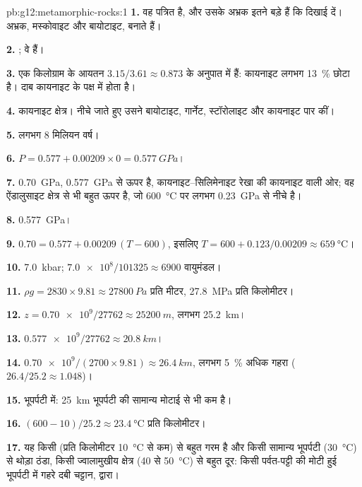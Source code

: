 \begin{solution}{pb:g12:metamorphic-rocks:1}
\textbf{1.} वह पत्रित है, और उसके अभ्रक इतने बड़े हैं कि दिखाई दें।
अभ्रक, मस्कोवाइट और बायोटाइट,  बनाते हैं।

\textbf{2.} ; वे  हैं।

\textbf{3.} एक किलोग्राम के आयतन $3.15/3.61 \approx
0.873$ के अनुपात में हैं: कायनाइट लगभग \qty{13}{\percent} छोटा है। दाब
कायनाइट के पक्ष में होता है।

\textbf{4.} कायनाइट क्षेत्र। नीचे जाते हुए उसने बायोटाइट,
गार्नेट, स्टॉरोलाइट और कायनाइट  पार कीं।

\textbf{5.} लगभग 8 मिलियन वर्ष।

\textbf{6.} $P = 0.577 + 0.00209 \times 0 = \qty{0.577}{GPa}$।

\textbf{7.} \qty{0.70}{GPa}, \qty{0.577}{GPa} से ऊपर है, कायनाइट--सिलिमेनाइट
रेखा की कायनाइट वाली ओर; वह ऐंडालुसाइट क्षेत्र से भी बहुत ऊपर है,
जो \qty{600}{\celsius} पर लगभग \qty{0.23}{GPa} से नीचे है।

\textbf{8.} \qty{0.577}{GPa}।

\textbf{9.} $0.70 = 0.577 + 0.00209\,(T - 600)$, इसलिए $T = 600 +
0.123/0.00209 \approx \qty{659}{\celsius}$।

\textbf{10.} \qty{7.0}{kbar}; $\num{7.0e8}/101325 \approx \num{6900}$
वायुमंडल।

\textbf{11.} $\rho g = 2830 \times 9.81 \approx \qty{27800}{Pa}$ प्रति मीटर,
\qty{27.8}{MPa} प्रति किलोमीटर।

\textbf{12.} $z = \num{0.70e9}/\num{27762} \approx \qty{25200}{m}$, लगभग
\qty{25.2}{km}।

\textbf{13.} $\num{0.577e9}/\num{27762} \approx \qty{20.8}{km}$।

\textbf{14.} $\num{0.70e9}/(2700 \times 9.81) \approx \qty{26.4}{km}$, लगभग
\qty{5}{\percent} अधिक गहरा ($26.4/25.2 \approx 1.048$)।

\textbf{15.} भूपर्पटी में: \qty{25}{km} भूपर्पटी की सामान्य मोटाई से भी
कम है।

\textbf{16.} $(600 - 10)/25.2 \approx \qty{23.4}{\celsius}$ प्रति किलोमीटर।

\textbf{17.} यह किसी  (प्रति किलोमीटर
\qty{10}{\celsius} से कम) से बहुत गरम है और किसी सामान्य भूपर्पटी
(\qty{30}{\celsius}) से थोड़ा ठंडा, किसी ज्वालामुखीय क्षेत्र (40 से \qty{50}{\celsius}) से बहुत दूर:
किसी पर्वत-पट्टी की मोटी हुई भूपर्पटी में गहरे दबी चट्टान,  द्वारा।


\end{solution}
